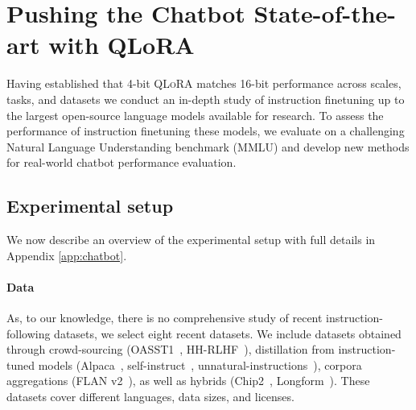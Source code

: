 \documentclass{article}
\newcommand{\method}{\textsc{QLoRA}\xspace}
\begin{document}
\section{Pushing the Chatbot State-of-the-art with QLoRA}
\label{sec:pushing}
Having established that 4-bit \method matches 16-bit performance across scales, tasks, and datasets we conduct an in-depth study of instruction finetuning up to the largest open-source language models available for research. To assess the performance of instruction finetuning these models, we evaluate on a challenging Natural Language Understanding benchmark (MMLU) and develop new methods for real-world  chatbot performance evaluation. 



\subsection{Experimental setup} 
We now describe an overview of the experimental setup with full details in Appendix \ref{app:chatbot}. 

\paragraph{Data} As, to our knowledge, there is no comprehensive study of recent instruction-following datasets, we select eight recent datasets. We include datasets obtained through crowd-sourcing (OASST1~\citep{kopf2023openassistant}, HH-RLHF~\citep{bai2022training}), distillation from instruction-tuned models (Alpaca~\citep{alpaca}, self-instruct~\citep{wang2022self}, unnatural-instructions~\citep{honovich2022unnatural}), corpora aggregations (FLAN v2~\citep{chung2022scaling}), as well as hybrids (Chip2~\citep{laion2023}, Longform~\citep{koksal2023longform}). These datasets cover different languages, data sizes, and licenses. 
\end{document}
